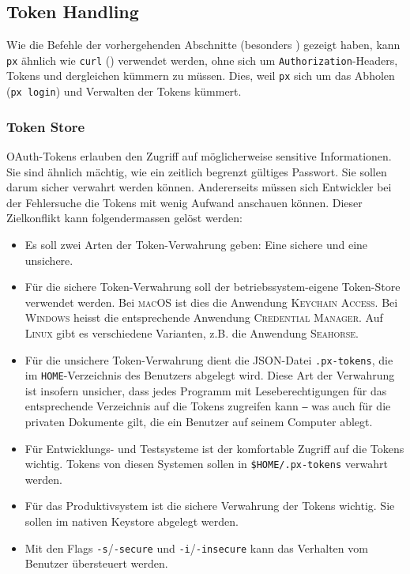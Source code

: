 \subsection{Token Handling}
\label{sec:Konzept-Token-Store}

Wie die Befehle der vorhergehenden Abschnitte (besonders ) gezeigt haben, kann \texttt{px} ähnlich wie \texttt{curl} () verwendet werden, ohne sich um \texttt{Authorization}-Headers, Tokens und dergleichen kümmern zu müssen. Dies, weil \texttt{px} sich um das Abholen (\texttt{px login}) und Verwalten der Tokens kümmert.

\subsubsection{Token Store}
\label{sec:Konzept-Token-Store}

OAuth-Tokens erlauben den Zugriff auf möglicherweise sensitive Informationen. Sie sind ähnlich mächtig, wie ein zeitlich begrenzt gültiges Passwort. Sie sollen darum sicher verwahrt werden können. Andererseits müssen sich Entwickler bei der Fehlersuche die Tokens mit wenig Aufwand anschauen können. Dieser Zielkonflikt kann folgendermassen gelöst werden:

\begin{itemize}
    \item Es soll zwei Arten der Token-Verwahrung geben: Eine sichere und eine unsichere.
    \item Für die sichere Token-Verwahrung soll der betriebssystem-eigene Token-Store verwendet werden. Bei \textsc{macOS} ist dies die Anwendung \textsc{Keychain Access}. Bei \textsc{Windows} heisst die entsprechende Anwendung \textsc{Credential Manager}. Auf \textsc{Linux} gibt es verschiedene Varianten, z.B. die Anwendung \textsc{Seahorse}.
    \item Für die unsichere Token-Verwahrung dient die JSON-Datei \texttt{.px-tokens}, die im \texttt{HOME}-Verzeichnis des Benutzers abgelegt wird. Diese Art der Verwahrung ist insofern unsicher, dass jedes Programm mit Leseberechtigungen für das entsprechende Verzeichnis auf die Tokens zugreifen kann ‒ was auch für die privaten Dokumente gilt, die ein Benutzer auf seinem Computer ablegt.
    \item Für Entwicklungs- und Testsysteme ist der komfortable Zugriff auf die Tokens wichtig. Tokens von diesen Systemen sollen in \texttt{\$HOME/.px-tokens} verwahrt werden.
    \item Für das Produktivsystem ist die sichere Verwahrung der Tokens wichtig. Sie sollen im nativen Keystore abgelegt werden.
    \item Mit den Flags \texttt{-s}/\texttt{-secure} und \texttt{-i}/\texttt{-insecure} kann das Verhalten vom Benutzer übersteuert werden.
\end{itemize}

